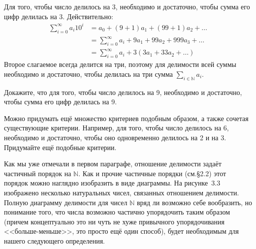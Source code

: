 \begin{example}
Для того, чтобы число делилось на 3, необходимо и достаточно, чтобы сумма его цифр делилась на 3. Действительно:
\begin{align*}
\sum_{i=0}^\infty a_i 10^i &= a_0 + (9+1)a_1 + (99+1)a_2 + \ldots\\
    &= \sum_{i=0}^\infty a_i + 9a_1 + 99a_2 + 999a_3 +\ldots \\
    &= \sum_{i=0}^\infty a_i + 3(3a_1 + 33a_2 +\ldots)
\end{align*}
Второе слагаемое всегда делится на три, поэтому для делимости всей суммы необходимо и достаточно, чтобы делилась на три сумма $\sum_{i\in\mathbb{N}} a_i$.
\end{example}

\begin{exercise}
Докажите, что для того, чтобы число делилось на 9, необходимо и достаточно, чтобы сумма его цифр делилась на 9.
\end{exercise}

\begin{example}
Можно придумать ещё множество критериев подобным образом, а также сочетая существующие критерии. Например, для того, чтобы число делилось на 6, необходимо и достаточно, чтобы оно одновременно делилось на 2 и на 3. Придумайте ещё подобные критерии.
\end{example}

Как мы уже отмечали в первом параграфе, отношение делимости задаёт частичный порядок на $\mathbb{N}$. Как и прочие частичные порядки (см.\S2.2) этот порядок можно наглядно изобразить в виде диаграммы. На рисунке~3.3 изображено несколько натуральных чисел, связанных отношением делимости. Полную диаграмму делимости для чисел $\mathbb{N}$ вряд ли возможно себе вообразить, но понимание того, что числа возможно частично упорядочить таким образом (причем концептуально это ни чуть не хуже привычного упорядочивания <<больше-меньше>>, это просто ещё один способ), будет необходимым для нашего следующего определения.

